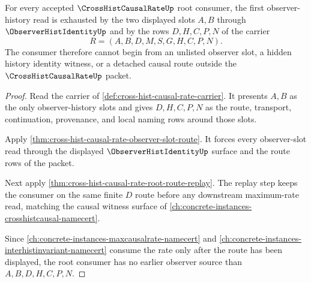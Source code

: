 \begin{theorem}
\label{thm:cross-hist-causal-rate-root-observer-slot-totality}
For every accepted $\CrossHistCausalRateUp$ root consumer, the first observer-history read is exhausted by the two displayed slots $A,B$ through $\ObserverHistIdentityUp$ and by the rows $D,H,C,P,N$ of the carrier
$$
R=(A,B,D,M,S,G,H,C,P,N).
$$
The consumer therefore cannot begin from an unlisted observer slot, a hidden history identity witness, or a detached causal route outside the $\CrossHistCausalRateUp$ packet.
\end{theorem}
\begin{proof}
Read the carrier of \autoref{def:cross-hist-causal-rate-carrier}. It presents $A,B$ as the only observer-history slots and gives $D,H,C,P,N$ as the route, transport, continuation, provenance, and local naming rows around those slots.

Apply \autoref{thm:cross-hist-causal-rate-observer-slot-route}. It forces every observer-slot read through the displayed $\ObserverHistIdentityUp$ surface and the route rows of the packet.

Next apply \autoref{thm:cross-hist-causal-rate-root-route-replay}. The replay step keeps the consumer on the same finite $D$ route before any downstream maximum-rate read, matching the causal witness surface of \autoref{ch:concrete-instances-crosshistcausal-namecert}.

Since \autoref{ch:concrete-instances-maxcausalrate-namecert} and \autoref{ch:concrete-instances-interhistinvariant-namecert} consume the rate only after the route has been displayed, the root consumer has no earlier observer source than $A,B,D,H,C,P,N$.
\end{proof}

